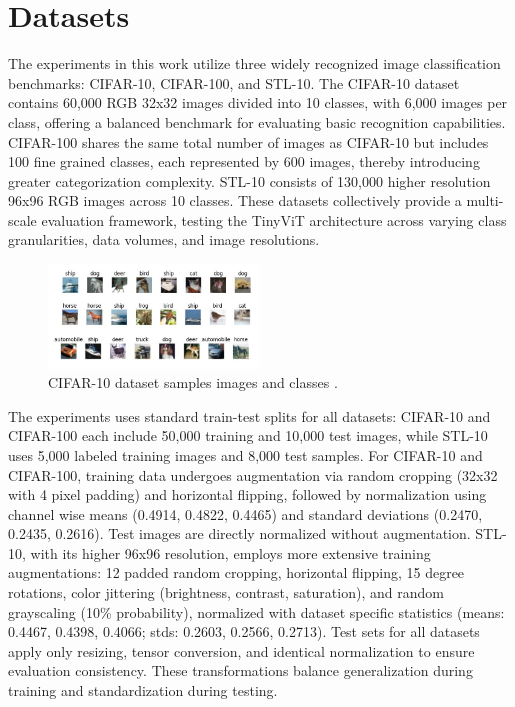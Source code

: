 \section{Datasets}
The experiments in this work utilize three widely recognized image classification benchmarks: CIFAR-10, CIFAR-100, and STL-10. The CIFAR-10 dataset contains 60,000 RGB 32x32 images divided into 10 classes, with 6,000 images per class, offering a balanced benchmark for evaluating basic recognition capabilities. CIFAR-100 shares the same total number of images as CIFAR-10 but includes 100 fine grained classes, each represented by 600 images, thereby introducing greater categorization complexity. STL-10 consists of 130,000 higher resolution 96x96 RGB images across 10 classes. These datasets collectively provide a multi-scale evaluation framework, testing the TinyViT architecture across varying class granularities, data volumes, and image resolutions.

\begin{figure}
    \centering
    \includegraphics[width=0.5\textwidth]{images/cifar-10.jpg}
    \caption{CIFAR-10 dataset samples images and classes \cite{krizhevsky2009learning}.}
    \label{fig:datasets}
\end{figure}

The experiments uses standard train-test splits for all datasets: CIFAR-10 and CIFAR-100 each include 50,000 training and 10,000 test images, while STL-10 uses 5,000 labeled training images and 8,000 test samples. For CIFAR-10 and CIFAR-100, training data undergoes augmentation via random cropping (32x32 with 4 pixel padding) and horizontal flipping, followed by normalization using channel wise means (0.4914, 0.4822, 0.4465) and standard deviations (0.2470, 0.2435, 0.2616). Test images are directly normalized without augmentation. STL-10, with its higher 96x96 resolution, employs more extensive training augmentations: 12 padded random cropping, horizontal flipping, 15 degree rotations, color jittering (brightness, contrast, saturation), and random grayscaling (10\% probability), normalized with dataset specific statistics (means: 0.4467, 0.4398, 0.4066; stds: 0.2603, 0.2566, 0.2713). Test sets for all datasets apply only resizing, tensor conversion, and identical normalization to ensure evaluation consistency. These transformations balance generalization during training and standardization during testing.